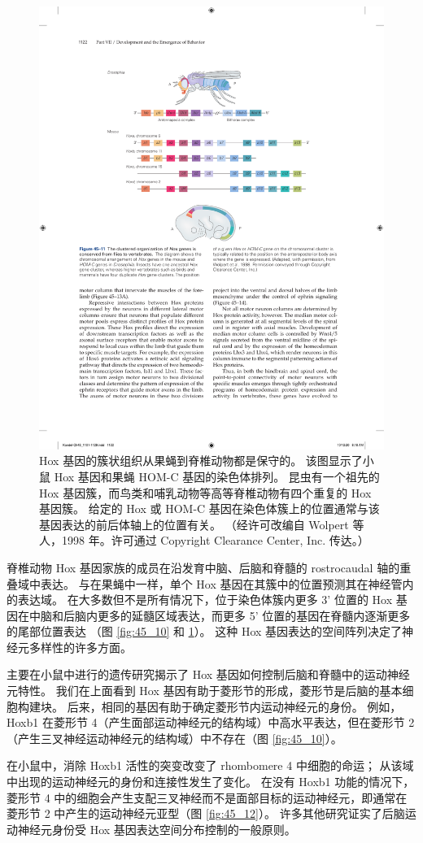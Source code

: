 \begin{figure}[htbp]
	\centering
	\includegraphics[width=0.7\linewidth]{chap45/fig_45_11}
	\caption{Hox 基因的簇状组织从果蝇到脊椎动物都是保守的。 该图显示了小鼠 Hox 基因和果蝇 HOM-C 基因的染色体排列。 昆虫有一个祖先的 Hox 基因簇，而鸟类和哺乳动物等高等脊椎动物有四个重复的 Hox 基因簇。 给定的 Hox 或 HOM-C 基因在染色体簇上的位置通常与该基因表达的前后体轴上的位置有关。 （经许可改编自 Wolpert 等人，1998 年。许可通过 Copyright Clearance Center, Inc. 传达。）}
	\label{fig:45_11}
\end{figure}

脊椎动物 Hox 基因家族的成员在沿发育中脑、后脑和脊髓的 rostrocaudal 轴的重叠域中表达。 与在果蝇中一样，单个 Hox 基因在其簇中的位置预测其在神经管内的表达域。 在大多数但不是所有情况下，位于染色体簇内更多 3' 位置的 Hox 基因在中脑和后脑内更多的延髓区域表达，而更多 5' 位置的基因在脊髓内逐渐更多的尾部位置表达 （图 \ref{fig:45_10} 和 \ref{fig:45_11}）。 这种 Hox 基因表达的空间阵列决定了神经元多样性的许多方面。

主要在小鼠中进行的遗传研究揭示了 Hox 基因如何控制后脑和脊髓中的运动神经元特性。 我们在上面看到 Hox 基因有助于菱形节的形成，菱形节是后脑的基本细胞构建块。 后来，相同的基因有助于确定菱形节内运动神经元的身份。 例如，Hoxb1 在菱形节 4（产生面部运动神经元的结构域）中高水平表达，但在菱形节 2（产生三叉神经运动神经元的结构域）中不存在（图 \ref{fig:45_10}）。

在小鼠中，消除 Hoxb1 活性的突变改变了 rhombomere 4 中细胞的命运； 从该域中出现的运动神经元的身份和连接性发生了变化。 
在没有 Hoxb1 功能的情况下，菱形节 4 中的细胞会产生支配三叉神经而不是面部目标的运动神经元，即通常在菱形节 2 中产生的运动神经元亚型（图 \ref{fig:45_12}）。 
许多其他研究证实了后脑运动神经元身份受 Hox 基因表达空间分布控制的一般原则。

